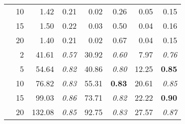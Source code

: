 \begin{table}[h]
\begin{tabular}{|p{1cm}|r|rr|rr|rr|}
                       & 10 & 1.42 & 0.21 & 0.02 & 0.26& 0.05 & 0.15  \\
                       & 15 & 1.50 & 0.22 & 0.03 & 0.50& 0.04 & 0.16  \\
                       & 20 & 1.40 & 0.21 & 0.02 & 0.67& 0.04 & 0.15  \\   
\hline                                
{} & 2 & 41.61 & \textit{0.57} & 30.92 & \textit{0.60} & 7.97 & \textit{0.76}  \\
                       & 5 & 54.64 & \textit{0.82} & 40.86 & \textit{0.80} & 12.25 & \textbf{0.85}  \\
                       & 10 & 76.82 & \textit{0.83} & 55.31 & \textbf{0.83} & 20.61 & \textit{0.85}  \\
                       & 15 & 99.03 & \textit{0.86} & 73.71 & \textit{0.82} & 22.22 & \textbf{0.90}  \\
                       & 20 & 132.08 & \textit{0.85} & 92.75 & \textit{0.83} & 27.57 & \textit{0.87}  \\ 

\hline                                
\end{tabular}
\end{table}
